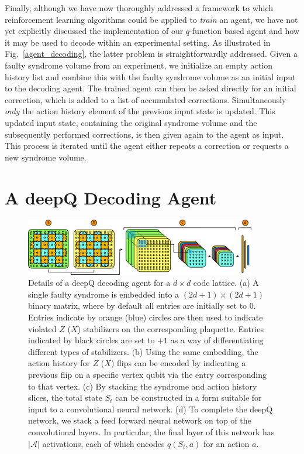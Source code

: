 \documentclass[twocolumn,preprintnumbers,amsmath,amssymb,notitlepage,nofootinbib,longbibliography,superscriptaddress,aps,pra,10pt]{revtex4-1}
\begin{document}
	Finally, although we have now thoroughly addressed a framework to which reinforcement learning algorithms could be applied to \textit{train} an agent, we have not yet explicitly discussed the implementation of our $q$-function based agent and how it may be used to decode within an experimental setting.
	As illustrated in Fig.~\ref{agent_decoding}, the latter problem is straightforwardly addressed.
	Given a faulty syndrome volume from an experiment, we initialize an empty action history list and combine this with the faulty syndrome volume as an initial input to the decoding agent.
	The trained agent can then be asked directly for an initial correction, which is added to a list of accumulated corrections.
	Simultaneously \textit{only} the action history element of the previous input state is updated.
	This updated input state, containing the original syndrome volume and the subsequently performed corrections, is then given again to the agent as input.
	This process is iterated until the agent either repeats a correction or requests a new syndrome volume.

\section{A deepQ Decoding Agent}\label{s:dq_agent}

	\begin{figure}
		\centering
		\includegraphics[width=0.9\textwidth]{figures/agent.pdf}
		\caption{
			Details of a deepQ decoding agent for a $d\times d$ code lattice.
			(a) A single faulty syndrome is embedded into a $(2d +1)\times(2d+1)$ binary matrix, where by default all entries are initially set to $0$.
			Entries indicate by orange (blue) circles are then used to indicate violated $Z$ ($X$) stabilizers on the corresponding plaquette.
			Entries indicated by black circles are set to $+1$ as a way of differentiating different types of stabilizers.
			(b) Using the same embedding, the action history for $Z$ ($X$) flips can be encoded by indicating a previous flip on a specific vertex qubit via the entry corresponding to that vertex.
			(c) By stacking the syndrome and action history slices, the total state $S_t$ can be constructed in a form suitable for input to a convolutional neural network.
			(d) To complete the deepQ network, we stack a feed forward neural network on top of the convolutional layers.
			In particular, the final layer of this network has $|\mathcal{A}|$ activations, each of which encodes $q(S_t,a)$ for an action $a$.
		}
		\label{f:agent}
	\end{figure}
\end{document}
